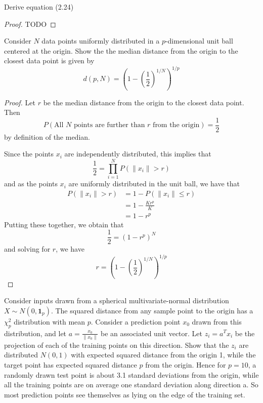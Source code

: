 \begin{exer}
    Derive equation (2.24)
\end{exer}

\begin{proof}
    TODO
\end{proof}
    
\begin{exer}
    Consider $N$ data points uniformly distributed in a $p$-dimensional unit ball centered at the origin.  Show the the median distance from the origin to the closest data point is given by \[
        d(p, N) = \left(1-\left(\frac{1}{2}\right)^{1/N}\right)^{1/p}
    \] 
\end{exer}
\begin{proof}
    Let $r$ be the median distance from the origin to the closest data point.  Then \[
        P(\text{All $N$ points are further than $r$ from the origin}) = \frac{1}{2}
    \] by definition of the median.

    Since the points $x_i$ are independently distributed, this implies that \[
        \frac{1}{2} = \prod_{i=1}^N P(\|x_i\| > r)
    \] and as the points $x_i$ are uniformly distributed in the unit ball, we have that \begin{align*}
        P(\| x_i \| > r) &= 1 - P(\| x_i \| \leq r) \\
                         &= 1 - \frac{Kr^p}{K} \\
                         &= 1 - r^p
    \end{align*}  Putting these together, we obtain that \[
        \frac{1}{2} = \left(1-r^p \right)^{N}
    \] and solving for $r$, we have \[
        r = \left(1-\left(\frac{1}{2}\right)^{1/N}\right)^{1/p}
    \]
\end{proof}

\begin{exer}
    Consider inputs drawn from a spherical multivariate-normal distribution $X \sim N(0,\mathbf{1}_p)$. The squared distance from any sample point to the origin has a $\chi^2_p$ distribution with mean $p$. Consider a prediction point $x_0$ drawn from this distribution, and let $a = \frac{x_0}{\| x_0\|}$ be an associated unit vector. Let $z_i = a^T x_i$ be the projection of each of the training points on this direction.
    Show that the $z_i$ are distributed $N(0,1)$ with expected squared distance from the origin 1, while the target point has expected squared distance $p$ from the origin.
    Hence for $p = 10$, a randomly drawn test point is about 3.1 standard deviations from the origin, while all the training points are on average one standard deviation along direction a. So most prediction points see themselves as lying on the edge of the training set.
\end{exer}

